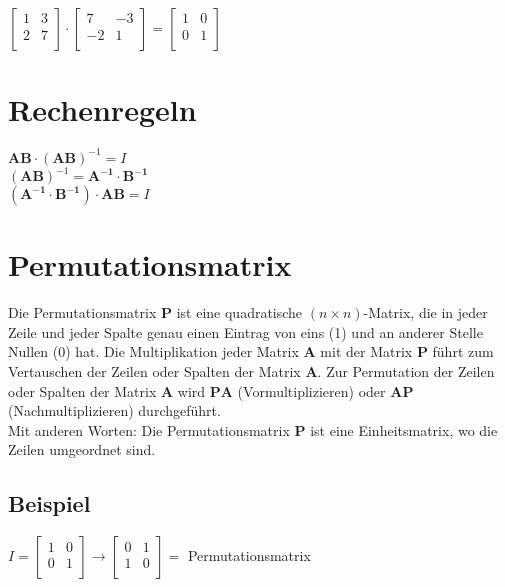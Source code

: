 \documentclass[../main.tex]{subfiles}
\begin{document}
$\begin{bmatrix}
    1 & 3 \\
    2 & 7 \\
\end{bmatrix} \cdot
\begin{bmatrix}
    7 & -3 \\
    -2 & 1 \\
\end{bmatrix}
=
\begin{bmatrix}
    1 & 0 \\
    0 & 1 \\
\end{bmatrix}$ \\ [7pt]


\section{Rechenregeln}
$\mathbf{AB}\cdot(\mathbf{AB})^{-1}=I$ \\ [7pt]
$(\mathbf{AB})^{-1} = \mathbf{A^{-1} \cdot B^{-1}}$ \\ [7pt]
$(\mathbf{A^{-1} \cdot B^{-1}})\cdot \mathbf{AB} = I$

\section{Permutationsmatrix}
Die Permutationsmatrix $\mathbf{P}$ ist eine quadratische $(n\times n)$-Matrix, die in jeder Zeile und jeder
Spalte genau einen Eintrag von eins (1) und an anderer Stelle Nullen (0) hat. Die
Multiplikation jeder Matrix $\mathbf{A}$ mit der Matrix $\mathbf{P}$ führt zum Vertauschen der Zeilen oder Spalten
der Matrix $\mathbf{A}$. Zur Permutation der Zeilen oder Spalten der Matrix $\mathbf{A}$ wird $\mathbf{PA}$
(Vormultiplizieren) oder $\mathbf{AP}$ (Nachmultiplizieren) durchgeführt. \\
Mit anderen Worten: Die Permutationsmatrix $\mathbf{P}$ ist eine Einheitsmatrix, wo die Zeilen umgeordnet sind.

\subsection{Beispiel}
$I=\begin{bmatrix}
    1 & 0 \\
    0 & 1 \\
\end{bmatrix} \rightarrow
\begin{bmatrix}
    0 & 1 \\
    1 & 0 \\
\end{bmatrix} = $ Permutationsmatrix \\ [7pt]
\end{document}
